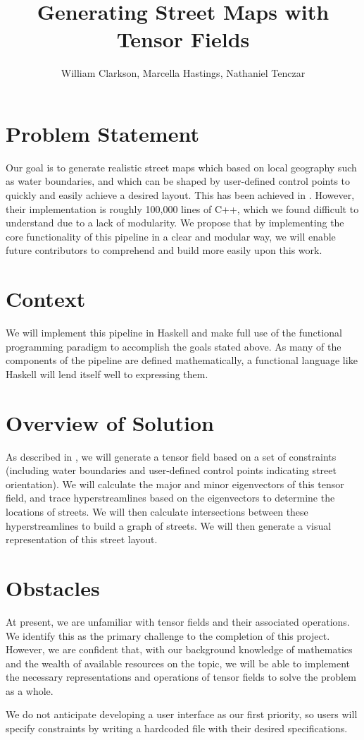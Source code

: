 \documentclass{proc}
\begin{document}
    
\title{Generating Street Maps with Tensor Fields}
\author{William Clarkson, Marcella Hastings, Nathaniel Tenczar}

\maketitle

\section{Problem Statement}
Our goal is to generate realistic street maps which based on local geography
such as water boundaries, and which can be shaped by user-defined
control points to quickly and easily achieve a desired layout. This has been
achieved in \cite{wonka}. However, their implementation is roughly 100,000
lines of C++, which we found difficult to understand due to a lack
of modularity. We propose that by implementing the core functionality of this
pipeline in a clear and modular way, we will enable future contributors
to comprehend and build more easily upon this work.

\section{Context}
We will implement this pipeline in Haskell and make full use of the functional
programming paradigm to accomplish the goals stated above. As many of the
components of the pipeline are defined mathematically, a functional
language like Haskell will lend itself well to expressing them.

\section{Overview of Solution}
As described in \cite{wonka}, we will generate a tensor field based on a set
of constraints (including water boundaries and user-defined control points
indicating street orientation). We will calculate the major and minor
eigenvectors of this tensor field, and trace hyperstreamlines based on
the eigenvectors to determine the locations of streets. We will then calculate
intersections between these hyperstreamlines to build a graph of streets. We
will then generate a visual representation of this street layout.

\section{Obstacles}
At present, we are unfamiliar with tensor fields and their associated
operations. We identify this as the primary challenge to the completion of this
project. However, we are confident that, with our background knowledge of
mathematics and the wealth of available resources on the topic, we will be able
to implement the necessary representations and operations of tensor fields to
solve the problem as a whole.
\par
We do not anticipate developing a user interface as our first priority, so users
will specify constraints by writing a hardcoded file with their desired 
specifications.
\end{document}
